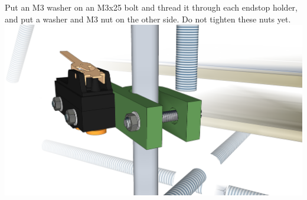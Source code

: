 \documentclass[twoside,openany,a4paper,titlepage]{memoir}
\begin{document}
	\section{}
	Put an M3 washer on an M3x25 bolt and thread it through each endstop holder, and put a washer and
	M3 nut on the other side. Do not tighten these nuts yet.\\
	\includegraphics[width=1\linewidth]{graphics/ch10_5.png}
	
\end{document}
